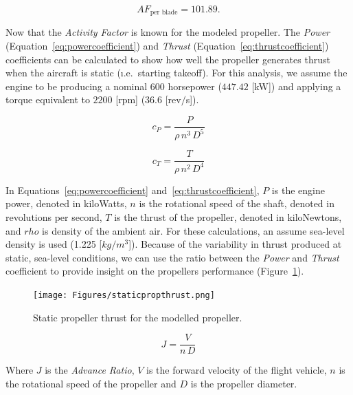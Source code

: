 \documentclass[12pt]{report}
\begin{document}
\begin{equation}\label{eq:activityfactorcalc2}
  AF_{\textrm{per blade}} = 101.89.
\end{equation}

Now that the \textit{Activity Factor} is known for the modeled propeller. The \textit{Power} (Equation~\ref{eq:powercoefficient}) and \textit{Thrust} (Equation~\ref{eq:thrustcoefficient}) coefficients can be calculated to show how well the propeller generates thrust when the aircraft is static (\i.e.\ starting takeoff). For this analysis, we assume the engine to be producing a nominal \(600\) horsepower (\(447.42\) [kW]) and applying a torque equivalent to \(2200\) [rpm] (\(36.6\) [rev\(/\)s]).

\begin{equation}\label{eq:powercoefficient}
  c_P = \frac{P}{\rho \, n^3 \, D^5}
\end{equation}

\begin{equation}\label{eq:thrustcoefficient}
  c_T = \frac{T}{\rho \, n^2 \, D^4}
\end{equation}

In Equations~\ref{eq:powercoefficient} and~\ref{eq:thrustcoefficient}, \(P\) is the engine power, denoted in kiloWatts, \(n\) is the rotational speed of the shaft, denoted in revolutions per second, \(T\) is the thrust of the propeller, denoted in kiloNewtons, and \( rho \) is density of the ambient air. For these calculations, an assume sea-level density is used (1.225 [\(kg/m^3\)]). Because of the variability in thrust produced at static, sea-level conditions, we can use the ratio between the \textit{Power} and \textit{Thrust} coefficient to provide insight on the propellers performance (Figure~\ref{fig:staticpropthrust}).

\begin{figure}[!ht]\label{fig:staticpropthrust}
  \centering
  \texttt{[image: Figures/staticpropthrust.png]}
  \caption{Static propeller thrust for the modelled propeller.}
\end{figure}


\begin{equation}\label{eq:advanceRatio}
  J = \frac{V}{n \, D}
\end{equation}

Where \(J\) is the \textit{Advance Ratio}, \(V\) is the forward velocity of the flight vehicle, \(n\) is the rotational speed of the propeller and \(D\) is the propeller diameter.
\end{document}
